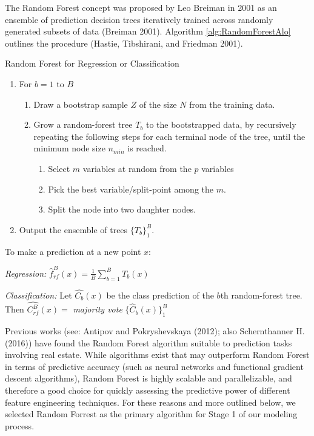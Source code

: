 \documentclass[12pt,]{article}
\begin{document}
The Random Forest concept was proposed by Leo Breiman in 2001 as an
ensemble of prediction decision trees iteratively trained across
randomly generated subsets of data (Breiman 2001). Algorithm
\ref{alg:RandomForestAlo} outlines the procedure (Hastie, Tibshirani,
and Friedman 2001).

\begin{algorithm}
  \caption{Random Forest for Regression or Classification}\label{alg:RandomForestAlo}

\begin{enumerate}
  \item For $b = 1$ to $B$
  \begin{enumerate}
    \item Draw a bootstrap sample $Z$ of the size $N$ from the training data.
    \item Grow a random-forest tree $T_b$ to the bootstrapped data, by recursively repeating the following steps for each terminal node of the tree, until the minimum node size $n_{min}$ is reached.
  \begin{enumerate}
    \item Select $m$ variables at random from the $p$ variables
    \item Pick the best variable/split-point among the $m$.
    \item Split the node into two daughter nodes.
  \end{enumerate}
  \end{enumerate}
  \item Output the ensemble of trees $\{T_b\}_1^B$.
\end{enumerate}

To make a prediction at a new point $x$:

\textit{Regression:} $\hat{f}_{rf}^B(x) = \frac{1}{B}\sum_{b=1}^{B}T_b(x)$

\textit{Classification:} Let $\hat{C_b}(x)$ be the class prediction of the $b$th random-forest tree. Then $\hat{C_{rf}^B}(x)=$ \textit{majority vote} $\{\hat{C}_{b}(x)\}_1^B $

\end{algorithm}

Previous works (see: Antipov and Pokryshevskaya (2012); also
Schernthanner H. (2016)) have found the Random Forest algorithm suitable
to prediction tasks involving real estate. While algorithms exist that
may outperform Random Forest in terms of predictive accuracy (such as
neural networks and functional gradient descent algorithms), Random
Forest is highly scalable and parallelizable, and therefore a good
choice for quickly assessing the predictive power of different feature
engineering techniques. For these reasons and more outlined below, we
selected Random Forrest as the primary algorithm for Stage 1 of our
modeling process.
\end{document}
